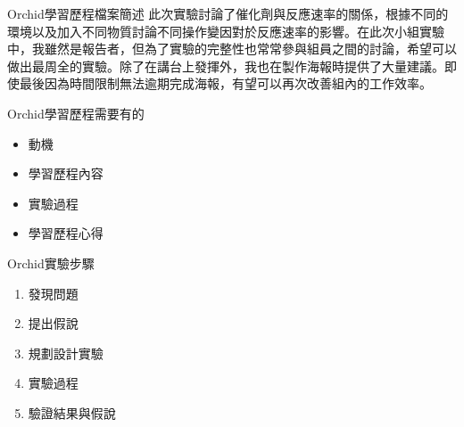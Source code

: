\documentclass{article}
\begin{document}

\begin{large}
\begin{boxpar}{Orchid}{學習歷程檔案簡述}
    此次實驗討論了催化劑與反應速率的關係，根據不同的環境以及加入不同物質討論不同操作變因對於反應速率的影響。在此次小組實驗中，我雖然是報告者，但為了實驗的完整性也常常參與組員之間的討論，希望可以做出最周全的實驗。除了在講台上發揮外，我也在製作海報時提供了大量建議。即使最後因為時間限制無法逾期完成海報，有望可以再次改善組內的工作效率。
\end{boxpar}
\begin{boxpar}{Orchid}{學習歷程需要有的}
    \begin{itemize}
\item 動機
\item 學習歷程內容
\item 實驗過程
\item 學習歷程心得
    \end {itemize}
\end{boxpar}
\begin{boxpar}{Orchid}{實驗步驟}
    \begin{enumerate}
\item 發現問題
\item 提出假說
\item 規劃設計實驗
\item 實驗過程
\item 驗證結果與假說
    \end {enumerate}
\end{boxpar}
\end{large}
\end{document}
